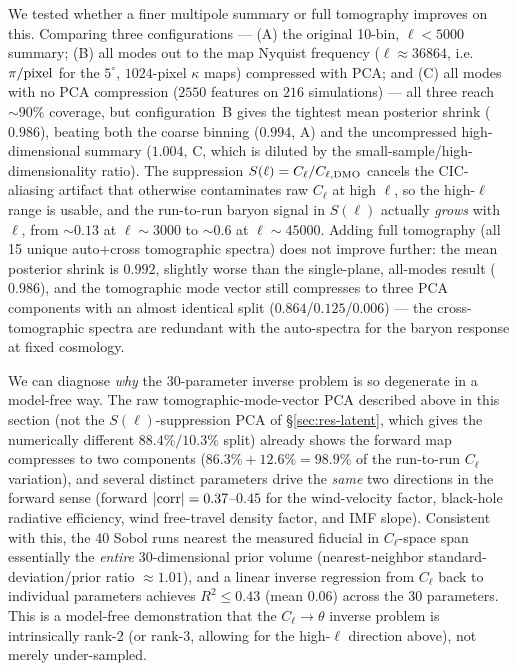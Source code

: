 \documentclass[11pt]{article}
\newcommand{\Sell}{S(\ell)}                    %
\begin{document}
We tested whether a finer multipole summary or full tomography improves on
this. Comparing three configurations — (A) the original 10-bin,
$\ell<5000$ summary; (B) all modes out to the map Nyquist frequency
($\ell\approx36864$, i.e.\ $\pi/{\rm pixel}$ for the $5^\circ$, $1024$-pixel
$\kappa$ maps) compressed with PCA; and (C) all modes with no PCA
compression ($2550$ features on $216$ simulations) — all three reach
$\sim\!90\%$ coverage, but configuration~B gives the tightest mean
posterior shrink ($0.986$), beating both the coarse binning ($0.994$, A)
and the uncompressed high-dimensional summary ($1.004$, C, which is
diluted by the small-sample/high-dimensionality ratio). %
The suppression $\Sell=C_\ell/C_{\ell,\rm DMO}$ cancels the CIC-aliasing
artifact that otherwise contaminates raw $C_\ell$ at high $\ell$, so the
high-$\ell$ range is usable, and the run-to-run baryon signal in $\Sell$
actually \emph{grows} with $\ell$, from $\sim\!0.13$ at $\ell\sim3000$ to
$\sim\!0.6$ at $\ell\sim45000$. %
Adding full tomography (all 15 unique auto+cross tomographic spectra) does
not improve further: the mean posterior shrink is $0.992$, slightly worse
than the single-plane, all-modes result ($0.986$), and the tomographic
mode vector still compresses to three PCA components with an almost
identical split ($0.864$/$0.125$/$0.006$) — the cross-tomographic spectra
are redundant with the auto-spectra for the baryon response at fixed
cosmology. %

We can diagnose \emph{why} the 30-parameter inverse problem is so
degenerate in a model-free way. The raw tomographic-mode-vector PCA
described above in this section (not the $\Sell$-suppression PCA of
\S\ref{sec:res-latent}, which gives the numerically different
$88.4\%/10.3\%$ split) already shows the forward map compresses to two
components ($86.3\%+12.6\%=98.9\%$ of the run-to-run $C_\ell$ variation), and several
distinct parameters drive the \emph{same} two directions in the forward
sense (forward $|{\rm corr}|=0.37$–$0.45$ for the wind-velocity factor,
black-hole radiative efficiency, wind free-travel density factor, and IMF
slope). %
Consistent with this, the 40 Sobol runs nearest the measured fiducial in
$C_\ell$-space span essentially the \emph{entire} 30-dimensional prior
volume (nearest-neighbor standard-deviation/prior ratio $\approx1.01$),
and a linear inverse regression from $C_\ell$ back to individual
parameters achieves $R^2\leq0.43$ (mean $0.06$) across the 30 parameters.
This is a model-free demonstration that the $C_\ell\to\theta$ inverse
problem is intrinsically rank-2 (or rank-3, allowing for the high-$\ell$
direction above), not merely under-sampled.
\end{document}
